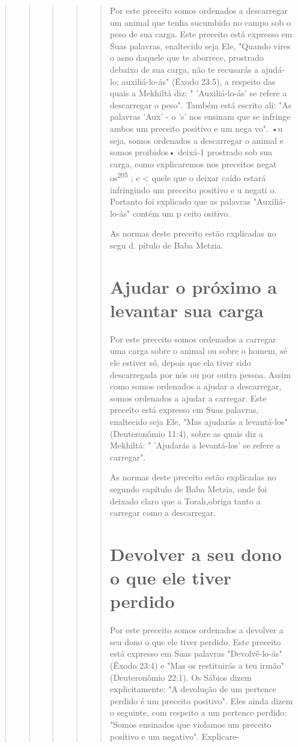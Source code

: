 \begin{quote}
\begin{quote}
\begin{quote}
\begin{quote}
\begin{quote}
Por este preceito somos ordenados a descarregar um animal que te­nha
sucumbido no campo sob o peso de sua carga. Este preceito está expresso
em Suas palavras, enaltecido seja Ele, "Quando vires o asno daquele que
te abor­rece, prostrado debaixo de sua carga, não te recusarás a
ajudá-lo; auxiliá-lo-ás" (Êxodo 23:5), a respeito das quais a Mekhiltá
diz: " 'Auxiliá-lo-ás' se refere a descarregar o peso". Também está
escrito ali: "As palavras 'Aux' - o 's' nos ensinam que se infringe
ambos um preceito positivo e um nega vo". •u seja, somos ordenados a
descarregar o animal e somos proibidos• deixá-1 pros­trado sob sua
carga, como explicaremos nos preceitos negat os\textsuperscript{205} ; e
\textless{} quele que o deixar caído estará infringindo um preceito
positivo e u negati o. Por­tanto foi explicado que as palavras
"Auxiliá-lo-ás" contém um p ceito ositivo.

As normas deste preceito estão explicadas no segu d. pítulo de Baba
Metzia.

\section{Ajudar o próximo a levantar sua carga}

Por este preceito somos ordenados a carregar uma carga sobre o ani­mal
ou sobre o homem, sé ele estiver só, depois que ela tiver sido
descarregada por nós ou por outra pessoa. Assim como somos ordenados a
ajudar a descar­regar, somos ordenados a ajudar a carregar. Este
preceito está expresso em Suas palavras, enaltecido seja Ele, "Mas
ajudarás a levantá-los" (Deuteronômio 11:4), sobre as quais diz a
Mekhiltá: " 'Ajudarás a levantá-los' se refere a carregar".

As normas deste preceito estão explicadas no segundo capítulo de Baba
Metzia, onde foi deixado claro que a Torah,obriga tanto a carregar como
a descarregar.

\section{Devolver a seu dono o que ele tiver perdido}

Por este preceito somos ordenados a devolver a seu dono o que ele tiver
perdido. Este preceito está expresso em Suas palavras "Devolvê-lo-ás"
(Êxo­do 23:4) e "Mas os restituirás a teu irmão" (Deuteronômio 22:1). Os
Sábios di­zem explicitamente: "A devolução de um pertence perdido é um
preceito po­sitivo". Eles ainda dizem o seguinte, com respeito a um
pertence perdido: "So­mos ensinados que violamos um preceito positivo e
um negativo". Explicare-


\end{quote}
\end{quote}
\end{quote}
\end{quote}
\end{quote}
